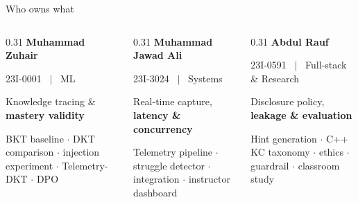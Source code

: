 \documentclass[aspectratio=169,11pt]{beamer}
\newcommand{\lead}[1]{\textbf{\color{accent}#1}}
\begin{document}
\begin{frame}{Who owns what}
  \vspace{0.15em}
  \begin{columns}[T]
    \begin{column}{0.31\textwidth}
      \lead{Muhammad Zuhair}\par{\scriptsize\color{muted}23I-0001 \ $\vert$ \ ML}\par\vspace{0.4em}
      {\footnotesize Knowledge tracing \& \textbf{mastery validity}\par\vspace{0.3em}
      {\scriptsize\color{muted}BKT baseline $\cdot$ DKT comparison $\cdot$ injection experiment $\cdot$ Telemetry-DKT $\cdot$ DPO}}
    \end{column}
    \begin{column}{0.31\textwidth}
      \lead{Muhammad Jawad Ali}\par{\scriptsize\color{muted}23I-3024 \ $\vert$ \ Systems}\par\vspace{0.4em}
      {\footnotesize Real-time capture, \textbf{latency \& concurrency}\par\vspace{0.3em}
      {\scriptsize\color{muted}Telemetry pipeline $\cdot$ struggle detector $\cdot$ integration $\cdot$ instructor dashboard}}
    \end{column}
    \begin{column}{0.31\textwidth}
      \lead{Abdul Rauf}\par{\scriptsize\color{muted}23I-0591 \ $\vert$ \ Full-stack \& Research}\par\vspace{0.4em}
      {\footnotesize Disclosure policy, \textbf{leakage \& evaluation}\par\vspace{0.3em}
      {\scriptsize\color{muted}Hint generation $\cdot$ C++ KC taxonomy $\cdot$ ethics $\cdot$ guardrail $\cdot$ classroom study}}
    \end{column}
  \end{columns}


\end{frame}
\end{document}
